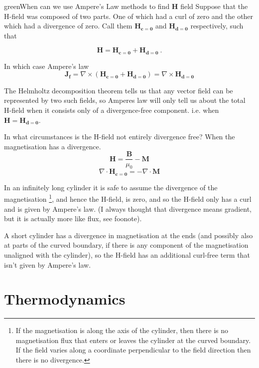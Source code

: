 \documentclass[12pt,a4paper]{extreport}
\numberwithin{equation}{chapter}
\begin{document}
    \begin{mybox}{green}{When can we use Ampere's Law methods to find $\mathbf{H}$ field}
        Suppose that the H-field was composed of two parts. One of which had a curl of zero and the other which had a divergence of zero. Call them $\mathbf{H_{c=0}}$ and $\mathbf{H_{d=0}}$ respectively, such that

        $$\mathbf{H} = \mathbf{H_{c=0}} + \mathbf{H_{d=0}}\ .$$

        In which case Ampere's law 
        $$\mathbf{J_f}=\nabla \times (\mathbf{H_{c=0}} + \mathbf{H_{d=0}})=\nabla \times \mathbf{H_{d=0}}$$

        The Helmholtz decomposition theorem tells us that any vector field can be represented by two such fields, so Amperes law will only tell us about the total H-field when it consists only of a divergence-free component. i.e. when $\mathbf{H}=\mathbf{H_{d=0}}$.

        In what circumstances is the H-field not entirely divergence free? When the magnetisation has a divergence.
        $$\mathbf{H}=\frac{\mathbf{B}}{\mu_0}-\mathbf{M}$$
        $$\nabla \cdot \mathbf{H_{c=0}} = - \nabla \cdot \mathbf{M}$$
    \end{mybox}
    In an infinitely long cylinder it is safe to assume the divergence of the magnetisation \footnote{ If the magnetisation is along the axis of the cylinder, then there is no magnetisation flux that enters or leaves the cylinder at the curved boundary. If the field varies along a coordinate perpendicular to the field direction then there is no divergence.}, and hence the H-field, is zero, and so the H-field only has a curl and is given by Ampere's law. (I always thought that divergence means gradient, but it is actually more like flux, see foonote). 
    
    A short cylinder has a divergence in magnetisation at the ends (and possibly also at parts of the curved boundary, if there is any component of the magnetisation unaligned with the cylinder), so the H-field has an additional curl-free term that isn't given by Ampere's law.

\chapter{Thermodynamics}
\end{document}
